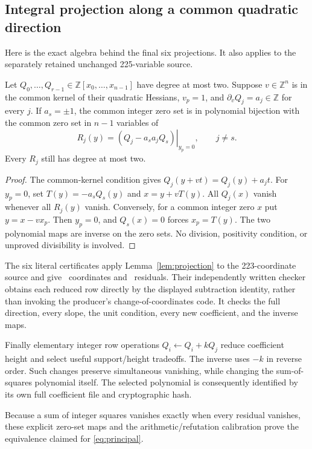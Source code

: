 \subsection{Integral projection along a common quadratic direction}

Here is the exact algebra behind the final six projections. It also
applies to the separately retained unchanged 225-variable source.

\begin{lemma}\label{lem:projection}
Let $Q_0,\ldots,Q_{r-1}\in\mathbb Z[x_0,\ldots,x_{n-1}]$ have
degree at most two. Suppose $v\in\mathbb Z^n$ is in the common kernel
of their quadratic Hessians, $v_p=1$, and
$\partial_vQ_j=a_j\in\mathbb Z$ for every $j$.
If $a_s=\pm1$, the common integer zero set is in polynomial bijection
with the common zero set in $n-1$ variables of
\[
 R_j(y)=\left.(Q_j-a_sa_jQ_s)\right|_{y_p=0},\qquad j\ne s.
\]
Every $R_j$ still has degree at most two.
\end{lemma}
\begin{proof}
The common-kernel condition gives $Q_j(y+vt)=Q_j(y)+a_jt$.
For $y_p=0$, set $T(y)=-a_sQ_s(y)$ and $x=y+vT(y)$.
All $Q_j(x)$ vanish whenever all $R_j(y)$ vanish.
Conversely, for a common integer zero $x$ put $y=x-vx_p$.
Then $y_p=0$, and $Q_s(x)=0$ forces $x_p=T(y)$.
The two polynomial maps are inverse on the zero sets. No division,
positivity condition, or unproved divisibility is involved.
\end{proof}

The six literal certificates apply Lemma~\ref{lem:projection} to the
223-coordinate source and give \DirectVars\ coordinates and
\DirectRows\ residuals. Their independently written checker obtains
each reduced row directly by the displayed subtraction identity,
rather than invoking the producer's change-of-coordinates code.
It checks the full direction, every slope, the unit condition, every
new coefficient, and the inverse maps.

Finally elementary integer row operations $Q_i\leftarrow Q_i+kQ_j$
reduce coefficient height and select useful support/height tradeoffs.
The inverse uses $-k$ in reverse order. Such changes preserve
simultaneous vanishing, while changing the sum-of-squares polynomial
itself. The selected polynomial is consequently identified by its own
full coefficient file and cryptographic hash.

Because a sum of integer squares vanishes exactly when every residual
vanishes, these explicit zero-set maps and the arithmetic/refutation
calibration prove the equivalence claimed for \eqref{eq:principal}.
